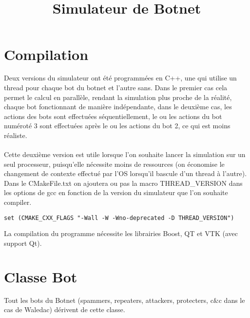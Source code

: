 \documentclass[11pt]{article}
\begin{document}
\title{Simulateur de Botnet}
\date{} 

\newcommand{\sautligneperso}{\newline\vspace{1mm}\newline}
\newcommand{\esp}[1]{\hspace*{#1mm}}

\maketitle
\section{Compilation}
Deux versions du simulateur ont été programmées en C++, une qui utilise un thread pour chaque bot du botnet et l'autre sans. Dans le premier cas cela permet le calcul en parallèle, rendant la simulation plus proche de la réalité, chaque bot fonctionnant de manière indépendante, dans le deuxième cas, les actions des bots sont effectuées séquentiellement, le ou les actions du bot numéroté 3 sont effectuées après le ou les actions du bot 2, ce qui est moins réaliste.\\\\ Cette deuxième version est utile lorsque l'on souhaite lancer la simulation sur un seul processeur, puisqu'elle nécessite moins de ressources (on économise le changement de contexte effectué par l'OS lorsqu'il bascule d'un thread à l'autre). Dans le CMakeFile.txt on ajoutera ou pas la macro THREAD\_VERSION dans les options de gcc en fonction de la version du simulateur que l'on souhaite compiler.  
\begin{center}
\begin{verbatim}
set (CMAKE_CXX_FLAGS "-Wall -W -Wno-deprecated -D THREAD_VERSION")
\end{verbatim}
\end{center}
La compilation du programme nécessite les librairies Boost, QT et VTK (avec support Qt). 
\newpage
\section{Classe Bot}
Tout les bots du Botnet (spammers, repeaters, attackers, protecters, c\&c dans le cas de Waledac) dérivent de cette classe.\\
\end{document}
